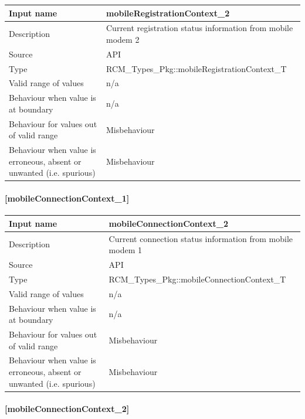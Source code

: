 \begin{longtable}{p{}p{}}
	\toprule
	Input name				& mobileRegistrationContext\_2 \\
	\midrule
	Description				& Current registration status information from mobile modem 2 \\
	\midrule
	Source					& API \\ 
	\midrule
	Type					& RCM\_Types\_Pkg::mobileRegistrationContext\_T \\
	\midrule
	Valid range of values	& n/a \\
	\midrule
	Behaviour when value is at boundary	& n/a \\
	\midrule
	Behaviour for values out of valid range	& Misbehaviour \\
	\midrule
	Behaviour when value is erroneous, absent or unwanted (i.e. spurious) & Misbehaviour \\
	\bottomrule
\end{longtable}

\paragraph{[mobileConnectionContext\_1]}

\begin{longtable}{p{}p{}}
	\toprule
	Input name				& mobileConnectionContext\_2 \\
	\midrule
	Description				& Current connection status information from mobile modem 1 \\
	\midrule
	Source					& API \\ 
	\midrule
	Type					& RCM\_Types\_Pkg::mobileConnectionContext\_T \\
	\midrule
	Valid range of values	& n/a \\
	\midrule
	Behaviour when value is at boundary	& n/a \\
	\midrule
	Behaviour for values out of valid range	& Misbehaviour \\
	\midrule
	Behaviour when value is erroneous, absent or unwanted (i.e. spurious) & Misbehaviour \\
	\bottomrule
\end{longtable}

\paragraph{[mobileConnectionContext\_2]}

